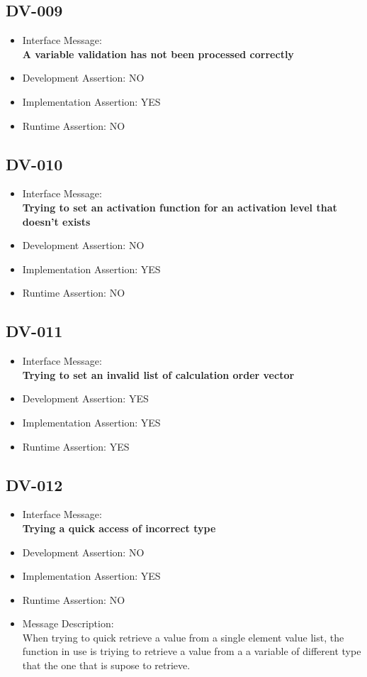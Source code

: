 \subsection{DV-009}
\begin{itemize}
  \item Interface Message:\\[1em]
    \textbf{A variable validation has not been processed correctly}
  \item Development Assertion: NO
  \item Implementation Assertion: YES
  \item Runtime Assertion: NO
\end{itemize}

\subsection{DV-010}
\begin{itemize}
  \item Interface Message:\\[1em]
    \textbf{Trying to set an activation function for an activation level that doesn't exists}
  \item Development Assertion: NO
  \item Implementation Assertion: YES
  \item Runtime Assertion: NO
\end{itemize}

\subsection{DV-011}
\begin{itemize}
  \item Interface Message:\\[1em]
    \textbf{Trying to set an invalid list of calculation order vector}
  \item Development Assertion: YES
  \item Implementation Assertion: YES
  \item Runtime Assertion: YES
\end{itemize}

\subsection{DV-012}
\begin{itemize}
  \item Interface Message:\\[1em]
    \textbf{Trying a quick access of incorrect type}
  \item Development Assertion: NO
  \item Implementation Assertion: YES
  \item Runtime Assertion: NO
  \item Message Description:\\[1em]
    When trying to quick retrieve a value from a single element value list, the function in use is triying to retrieve a value from a a variable of different type that the one that is supose to retrieve.
\end{itemize}

